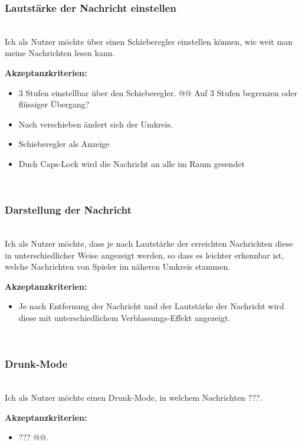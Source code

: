 \documentclass[conference]{IEEEtran}
\begin{document}
	\subsubsection{Lautstärke der Nachricht einstellen}
	\ \\
	Ich als Nutzer möchte über einen Schieberegler einstellen können, wie weit man meine Nachrichten lesen kann.
	
	\textbf{Akzeptanzkriterien:}
	\begin{itemize}
		\item 3 Stufen einstellbar über den Schieberegler.  @@ Auf 3 Stufen begrenzen oder flüssiger Übergang?
		\item Nach verschieben ändert sich der Umkreis.
		\item Schieberegler als Anzeige
		\item Duch Caps-Lock wird die Nachricht an alle im Raum gesendet
	\end{itemize}
	\ \\
	
	\subsubsection{Darstellung der Nachricht}
	\ \\
	Ich als Nutzer möchte, dass je nach Lautstärke der erreichten Nachrichten diese in unterschiedlicher Weise angezeigt werden, so dass es leichter erkennbar ist, welche Nachrichten von Spieler im näheren Umkreis stammen.
	
	\textbf{Akzeptanzkriterien:}
	\begin{itemize}
		\item Je nach Entfernung der Nachricht und der Lautstärke der Nachricht wird diese mit unterschiedlichem Verblassungs-Effekt angezeigt.
	\end{itemize}
	\ \\

	\subsubsection{Drunk-Mode}
	\ \\
	Ich als Nutzer möchte einen Drunk-Mode, in welchem Nachrichten ???.
	
	\textbf{Akzeptanzkriterien:}
	\begin{itemize}
		\item ??? @@.
	\end{itemize}

\ \\
\end{document}
